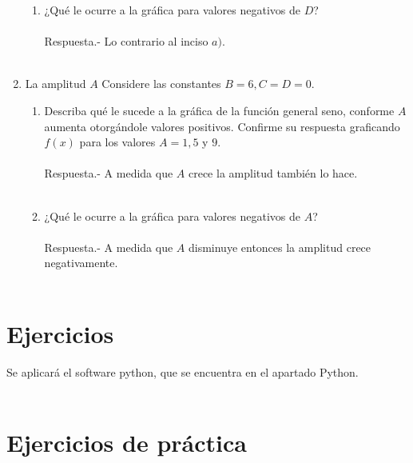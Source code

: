 \begin{enumerate}
\begin{enumerate}[\bfseries a)]
	\item ¿Qué le ocurre a la gráfica para valores negativos de $D$?\\\\
	    Respuesta.-\; Lo contrario al inciso $a)$.\\\\

    \end{enumerate}

\item La amplitud $A$ Considere las constantes $B = 6, C = D = 0$.

    \begin{enumerate}[\bfseries a)]

	\item Describa qué le sucede a la gráfica de la función general seno, conforme $A$ aumenta otorgándole valores positivos. Confirme su respuesta graficando $f(x)$ para los valores $A = 1, 5$ y $9$.\\\\
	    Respuesta.-\; A medida que $A$ crece la amplitud también lo hace.\\\\

	\item ¿Qué le ocurre a la gráfica para valores negativos de $A$?\\\\
	    Respuesta.-\; A medida que $A$ disminuye entonces la amplitud crece negativamente.\\\\

    \end{enumerate}

\end{enumerate}


\section{Ejercicios}

Se aplicará el software python, que se encuentra en el apartado Python.\\\\

\section{Ejercicios de práctica}

